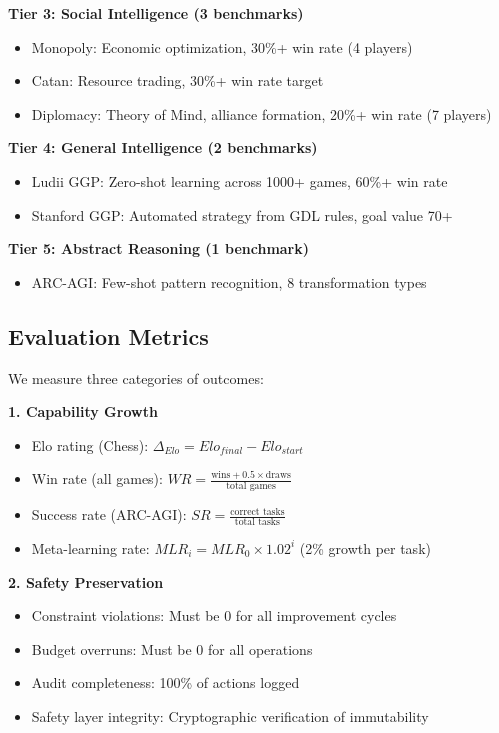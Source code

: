 \documentclass[11pt,letterpaper]{article}
\begin{document}
\textbf{Tier 3: Social Intelligence (3 benchmarks)}
\begin{itemize}
\item Monopoly: Economic optimization, 30\%+ win rate (4 players)
\item Catan: Resource trading, 30\%+ win rate target
\item Diplomacy: Theory of Mind, alliance formation, 20\%+ win rate (7 players)
\end{itemize}

\textbf{Tier 4: General Intelligence (2 benchmarks)}
\begin{itemize}
\item Ludii GGP: Zero-shot learning across 1000+ games, 60\%+ win rate
\item Stanford GGP: Automated strategy from GDL rules, goal value 70+
\end{itemize}

\textbf{Tier 5: Abstract Reasoning (1 benchmark)}
\begin{itemize}
\item ARC-AGI: Few-shot pattern recognition, 8 transformation types
\end{itemize}

\subsection{Evaluation Metrics}

We measure three categories of outcomes:

\textbf{1. Capability Growth}
\begin{itemize}
\item Elo rating (Chess): $\Delta_{Elo} = Elo_{final} - Elo_{start}$
\item Win rate (all games): $WR = \frac{\text{wins} + 0.5 \times \text{draws}}{\text{total games}}$
\item Success rate (ARC-AGI): $SR = \frac{\text{correct tasks}}{\text{total tasks}}$
\item Meta-learning rate: $MLR_i = MLR_0 \times 1.02^i$ (2\% growth per task)
\end{itemize}

\textbf{2. Safety Preservation}
\begin{itemize}
\item Constraint violations: Must be 0 for all improvement cycles
\item Budget overruns: Must be 0 for all operations
\item Audit completeness: 100\% of actions logged
\item Safety layer integrity: Cryptographic verification of immutability
\end{itemize}
\end{document}
